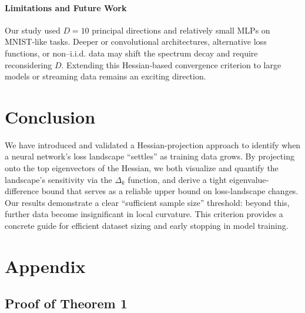 \documentclass{article}
\begin{document}
\paragraph{Limitations and Future Work}
Our study used $D = 10$ principal directions and relatively small MLPs on MNIST‐like tasks. Deeper or convolutional architectures,
alternative loss functions, or non–i.i.d. data may shift the spectrum decay and require reconsidering $D$. Extending this
Hessian‐based convergence criterion to large models or streaming data remains an exciting direction.


\section{Conclusion}\label{sec:concl}

We have introduced and validated a Hessian‐projection approach to identify when a neural network’s loss landscape “settles” as
training data grows. By projecting onto the top eigenvectors of the Hessian, we both visualize and quantify the landscape’s
sensitivity via the $\Delta_k$ function, and derive a tight eigenvalue‐difference bound that serves as a reliable upper bound on
loss‐landscape changes. Our results demonstrate a clear “sufficient sample size” threshold: beyond this, further data become
insignificant in local curvature. This criterion provides a concrete guide for efficient dataset sizing and early stopping in
model training.


\nocite{*}





\newpage
\appendix
\section{Appendix}\label{app}

\subsection{Proof of Theorem 1}\label{app:th_1}
\end{document}
